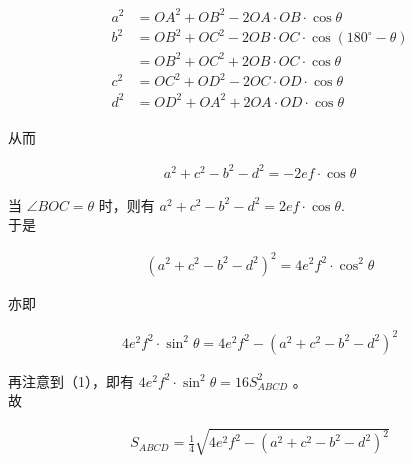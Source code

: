\documentclass[10pt]{article}
\begin{document}
\begin{align*}
\begin{aligned}
a^{2} & =O A^{2}+O B^{2}-2 O A \cdot O B \cdot \cos \theta \\
b^{2} & =O B^{2}+O C^{2}-2 O B \cdot O C \cdot \cos \left(180^{\circ}-\theta\right) \\
& =O B^{2}+O C^{2}+2 O B \cdot O C \cdot \cos \theta \\
c^{2} & =O C^{2}+O D^{2}-2 O C \cdot O D \cdot \cos \theta \\
d^{2} & =O D^{2}+O A^{2}+2 O A \cdot O D \cdot \cos \theta
\end{aligned}
\end{align*}

从而

\begin{align*}
a^{2}+c^{2}-b^{2}-d^{2}=-2 e f \cdot \cos \theta
\end{align*}

当 $\angle B O C=\theta$ 时，则有 $a^{2}+c^{2}-b^{2}-d^{2}=2 e f \cdot \cos \theta$.\\
于是

\begin{align*}
\left(a^{2}+c^{2}-b^{2}-d^{2}\right)^{2}=4 e^{2} f^{2} \cdot \cos ^{2} \theta
\end{align*}

亦即

\begin{align*}
4 e^{2} f^{2} \cdot \sin ^{2} \theta=4 e^{2} f^{2}-\left(a^{2}+c^{2}-b^{2}-d^{2}\right)^{2}
\end{align*}

再注意到（1），即有 $4 e^{2} f^{2} \cdot \sin ^{2} \theta=16 S_{A B C D}^{2}$ 。\\
故

\begin{align*}
S_{A B C D}=\frac{1}{4} \sqrt{4 e^{2} f^{2}-\left(a^{2}+c^{2}-b^{2}-d^{2}\right)^{2}}
\end{align*}
\end{document}
